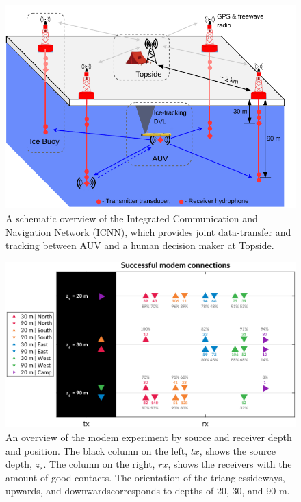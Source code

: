 \begin{figure}[h!]
	\centering
	\includegraphics[width=\textwidth]{figs/Fig2.pdf}
	\caption{A schematic overview of the Integrated Communication and Navigation Network (ICNN), which provides joint data-transfer and tracking between AUV and a human decision maker at Topside.}
	\label{fig:icnnOverview}
\end{figure}

\begin{figure}[h!]
  \centering
  \includegraphics[width=\textwidth]{figs/modem-chart.pdf}
  \caption{An overview of the modem experiment by source and receiver depth and position. The black column on the left, $tx$, shows the source depth, $z_s$. The column on the right, $rx$, shows the receivers with the amount of good contacts. The orientation of the triangles\textemdash sideways, upwards, and downwards\textemdash corresponds to depths of 20, 30, and 90 m.}
  \label{fig:overview}
  \end{figure}

